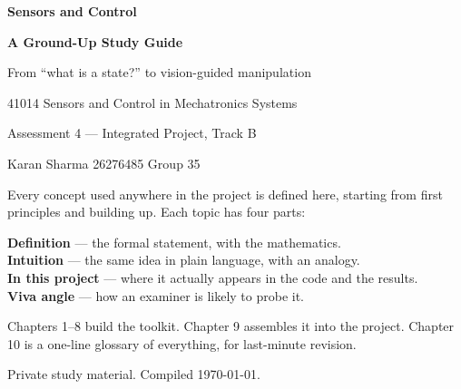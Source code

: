 \documentclass[11pt,oneside]{report}
\begin{document}
\begin{titlepage}
\centering
\vspace*{3cm}
{\Huge\bfseries\color{defblue} Sensors and Control\par}
\vspace{6mm}
{\Huge\bfseries\color{defblue} A Ground-Up Study Guide\par}
\vspace{12mm}
{\Large From ``what is a state?'' to vision-guided manipulation\par}
\vspace{20mm}
{\large 41014 Sensors and Control in Mechatronics Systems\par}
{\large Assessment 4 --- Integrated Project, Track B\par}
\vspace{8mm}
{\large Karan Sharma \textbar{} 26276485 \textbar{} Group 35\par}
\vspace{25mm}
\begin{tcolorbox}[enhanced,width=0.85\textwidth,colback=defbg,colframe=defblue,
  coltitle=white,fonttitle=\bfseries,title={How to read this}]
Every concept used anywhere in the project is defined here, starting from first principles and
building up. Each topic has four parts:
\medskip

\textbf{Definition} --- the formal statement, with the mathematics.\\
\textbf{Intuition} --- the same idea in plain language, with an analogy.\\
\textbf{In this project} --- where it actually appears in the code and the results.\\
\textbf{Viva angle} --- how an examiner is likely to probe it.
\medskip

Chapters 1--8 build the toolkit. Chapter 9 assembles it into the project. Chapter 10 is a one-line
glossary of everything, for last-minute revision.
\end{tcolorbox}
\vfill
{\small Private study material. Compiled \today.\par}
\end{titlepage}

\tableofcontents
\clearpage











\end{document}

